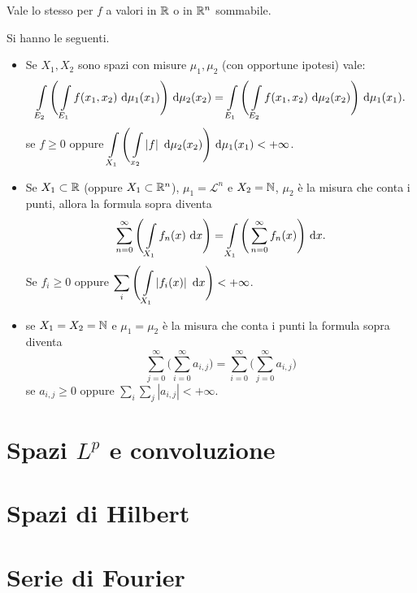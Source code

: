 \documentclass[a4paper, 11pt]{report}
\begin{document}
%
Vale lo stesso per $f$ a valori in $\mathbb R$ o in $\mathbb R^n$ sommabile.
%
\begin{osservazione}
Si hanno le seguenti.
\begin{itemize}[label={--}]
	\item Se $X_1, X_2$ sono spazi con misure $\mu_1,\mu_2$ (con opportune ipotesi) vale:
	\[
		\int\limits_{\mathclap{E_2}}^{} \Bigg( \int\limits_{\mathclap{E_1}}^{} f(x_1,x_2) \, \dd \mu_1(x_1)  \Bigg) \, \dd \mu_2(x_2) = \int\limits_{\mathclap{E_1}}^{} \Bigg( \int\limits_{\mathclap{E_2}}^{} f(x_1,x_2) \, \dd \mu_2(x_2)  \Bigg) \, \dd \mu_1(x_1).
	\] 
	se $f\geq 0$ oppure $\displaystyle \int\limits_{\mathclap{X_1}}^{} \Bigg( \int\limits_{\mathclap{x_2}}^{} \left| f \right| \, \dd \mu_2(x_2)  \Bigg) \, \dd \mu_1(x_1) < + \infty $.
	\item Se $X_1 \subset \mathbb R$ (oppure $X_1 \subset \mathbb R^n$), $\mu_1 = \mathcal{L}^n$ e $X_2 = \mathbb N$, $\mu_2$ è la misura che conta i punti, allora la formula sopra diventa
	\[
		\sum_{n=0}^{\infty} \Bigg( \int\limits_{\mathclap{X_1}}^{} f_n(x) \, \dd x  \Bigg) = \int\limits_{\mathclap{X_1}}^{} \Bigg( \sum_{n=0}^{\infty} f_n(x)  \Bigg) \, \dd x.
	\] 
	Se $f_i \geq 0$ oppure $\displaystyle \sum_{i} \Bigg( \int\limits_{\mathclap{X_1}}^{} \left| f_i(x) \right| \, \dd x  \Bigg) < + \infty $.
	\item se $X_1 = X_2 = \mathbb N$ e $\mu_1 = \mu_2$ è la misura che conta i punti la formula sopra diventa
	\[
		\sum_{j=0}^{\infty} \Bigg( \sum_{i=0}^{\infty} a_{i,j}  \Bigg) = \sum_{i=0}^{\infty} \Bigg( \sum_{j=0}^{\infty} a_{i,j}  \Bigg)
	\] 
	se $a_{i,j} \geq 0$ oppure $\sum_{i} \sum_{j} \left| a_{i,j} \right| < +\infty $.
\end{itemize}
\end{osservazione}








\chapter{Spazi $L^p$ e convoluzione}


\chapter{Spazi di Hilbert}


\chapter{Serie di Fourier}
\end{document}

